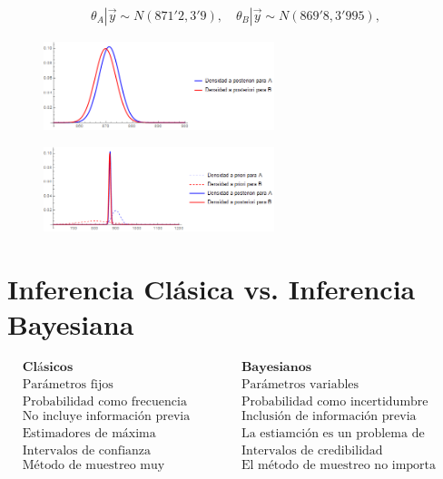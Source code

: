 \begin{ejemplo}
\begin{align*}
        \theta_A | \vec{y} \sim N(871'2, 3'9), \quad \theta_B | \vec{y} \sim N(869'8, 3'995),
    \end{align*}
    \begin{figure}[H]
        \centering
        \includegraphics[width=0.6\textwidth]{imagenes4/aposte4.png}
    \end{figure}
    \begin{figure}[H]
        \centering
        \includegraphics[width=0.6\textwidth]{imagenes4/aposte5.png}
    \end{figure}
\end{ejemplo}

\section{Inferencia Clásica vs. Inferencia Bayesiana}

\begin{align*}
     & \textbf{Clásicos}                          &  & \textbf{Bayesianos}                             \\
     & \text{Parámetros fijos}                    &  & \text{Parámetros variables}                     \\
     & \text{Probabilidad como frecuencia límite} &  & \text{Probabilidad como incertidumbre}          \\
     & \text{No incluye información previa}       &  & \text{Inclusión de información previa}          \\
     & \text{Estimadores de máxima verosimilitud} &  & \text{La estiamción es un problema de decisión} \\
     & \text{Intervalos de confianza}             &  & \text{Intervalos de credibilidad}               \\
     & \text{Método de muestreo muy importante}   &  & \text{El método de muestreo no importa}
\end{align*}

